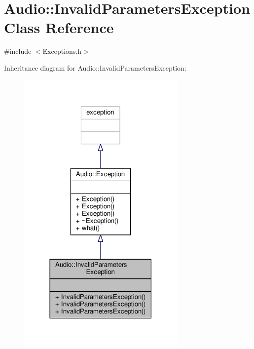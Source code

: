 \hypertarget{classAudio_1_1InvalidParametersException}{}\section{Audio\+:\+:Invalid\+Parameters\+Exception Class Reference}
\label{classAudio_1_1InvalidParametersException}


{\ttfamily \#include $<$Exceptions.\+h$>$}



Inheritance diagram for Audio\+:\+:Invalid\+Parameters\+Exception\+:
\nopagebreak
\begin{figure}[H]
\begin{center}
\leavevmode
\includegraphics[width=234pt]{dd/d5e/classAudio_1_1InvalidParametersException__inherit__graph}
\end{center}
\end{figure}


